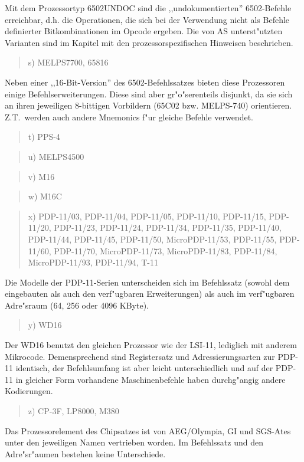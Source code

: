 \documentclass[12pt,a4paper,twoside]{report}
\begin{document}
Mit dem Prozessortyp 6502UNDOC sind die ,,undokumentierten''
6502-Befehle erreichbar, d.h. die Operationen, die sich bei der Verwendung
nicht als Befehle definierter Bitkombinationen im Opcode ergeben.  Die von
AS unterst"utzten Varianten sind im Kapitel mit den prozessorspezifischen
Hinweisen beschrieben.
\begin{quote}
s) MELPS7700, 65816
\end{quote}
Neben einer ,,16-Bit-Version'' des 6502-Befehlssatzes bieten diese
Prozessoren einige Befehlserweiterungen.  Diese sind aber gr"o"serenteils
disjunkt, da sie sich an ihren jeweiligen 8-bittigen Vorbildern (65C02
bzw. MELPS-740) orientieren.  Z.T.~werden auch andere Mnemonics f"ur
gleiche Befehle verwendet.
\begin{quote}
t) PPS-4
\end{quote}
\begin{quote}
u) MELPS4500
\end{quote}
\begin{quote}
v) M16
\end{quote}
\begin{quote}
w) M16C
\end{quote}
\begin{quote}
x) PDP-11/03, PDP-11/04, PDP-11/05, PDP-11/10,
   PDP-11/15, PDP-11/20, PDP-11/23, PDP-11/24,
   PDP-11/34, PDP-11/35, PDP-11/40, PDP-11/44,
   PDP-11/45, PDP-11/50, MicroPDP-11/53,
   PDP-11/55, PDP-11/60, PDP-11/70, MicroPDP-11/73,
   MicroPDP-11/83, PDP-11/84, MicroPDP-11/93,
   PDP-11/94, T-11
\end{quote}
Die Modelle der PDP-11-Serien unterscheiden sich im
Befehlssatz (sowohl dem eingebauten als auch den verf"ugbaren
Erweiterungen) als auch im verf"ugbaren Adre"sraum (64, 256
oder 4096 KByte).
\begin{quote}
y) WD16
\end{quote}
Der WD16 benutzt den gleichen Prozessor wie der LSI-11, 
lediglich mit anderem Mikrocode.  Demensprechend sind
Registersatz und Adressierungsarten zur PDP-11 identisch,
der Befehlsumfang ist aber leicht unterschiedlich und
auf der PDP-11 in gleicher Form vorhandene Maschinenbefehle
haben durchg"angig andere Kodierungen.
\begin{quote}
z) CP-3F, LP8000, M380
\end{quote}
Das Prozessorelement des Chipsatzes ist von AEG/Olympia, GI
und SGS-Ates unter den jeweiligen Namen vertrieben worden.
Im Befehlssatz und den Adre"sr"aumen bestehen keine Unterschiede.
\end{document}
